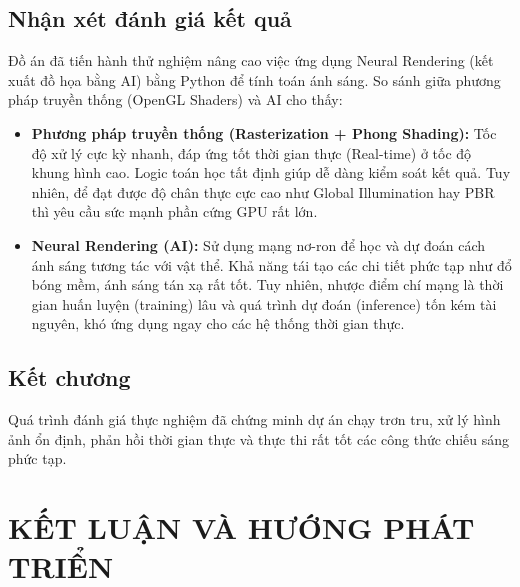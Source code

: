 \documentclass[13pt, a4paper]{extarticle}
\begin{document}
\subsection{Nhận xét đánh giá kết quả}
Đồ án đã tiến hành thử nghiệm nâng cao việc ứng dụng Neural Rendering (kết xuất đồ họa bằng AI) bằng Python để tính toán ánh sáng. So sánh giữa phương pháp truyền thống (OpenGL Shaders) và AI cho thấy:
\begin{itemize}
    \item \textbf{Phương pháp truyền thống (Rasterization + Phong Shading):} Tốc độ xử lý cực kỳ nhanh, đáp ứng tốt thời gian thực (Real-time) ở tốc độ khung hình cao. Logic toán học tất định giúp dễ dàng kiểm soát kết quả. Tuy nhiên, để đạt được độ chân thực cực cao như Global Illumination hay PBR thì yêu cầu sức mạnh phần cứng GPU rất lớn.
    \item \textbf{Neural Rendering (AI):} Sử dụng mạng nơ-ron để học và dự đoán cách ánh sáng tương tác với vật thể. Khả năng tái tạo các chi tiết phức tạp như đổ bóng mềm, ánh sáng tán xạ rất tốt. Tuy nhiên, nhược điểm chí mạng là thời gian huấn luyện (training) lâu và quá trình dự đoán (inference) tốn kém tài nguyên, khó ứng dụng ngay cho các hệ thống thời gian thực.
\end{itemize}

\subsection{Kết chương}
Quá trình đánh giá thực nghiệm đã chứng minh dự án chạy trơn tru, xử lý hình ảnh ổn định, phản hồi thời gian thực và thực thi rất tốt các công thức chiếu sáng phức tạp.

\newpage
\section*{KẾT LUẬN VÀ HƯỚNG PHÁT TRIỂN}
\end{document}
